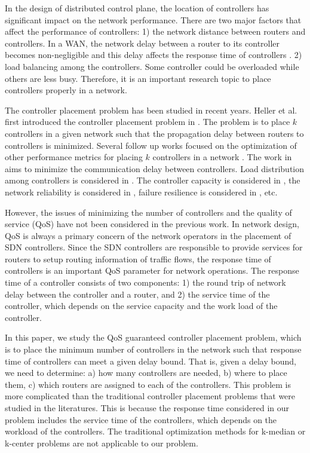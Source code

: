 \documentclass[conference]{IEEEtran}
\begin{document}
In the design of distributed control plane, the location of controllers has significant impact on the network performance. There are two major factors that affect the performance of controllers: 1) the network distance between routers and controllers. In a WAN, the network delay between a router to its controller becomes non-negligible and this delay affects the response time of controllers \cite{jain2013b4}. 2) load balancing among the controllers. Some controller could be overloaded while others are less busy. Therefore, it is an important research topic to place controllers properly in a network.       

The controller placement problem has been studied in recent years. Heller et al. first introduced the controller placement problem in \cite{heller2012controller}. The problem is to place $k$ controllers in a given network such that the propagation delay between routers to controllers is minimized. Several follow up works focused on the optimization of other performance metrics for placing $k$ controllers in a network \cite{schmid2013exploiting,jimenez2014controller,yao2014capacitated,ros2014five,hock2013pareto}. 
The work in \cite{schmid2013exploiting} aims to minimize the communication delay between controllers. Load distribution among controllers is considered in \cite{jimenez2014controller}. The controller capacity is considered in \cite{yao2014capacitated}, the network reliability is considered in \cite{ros2014five}, failure resilience is considered in \cite{hock2013pareto}, etc. 

However, the issues of minimizing the number of controllers and the quality of service (QoS) have not been considered in the previous work. In network design, QoS is always a primary concern of the network operators in the placement of SDN controllers. Since the SDN controllers are responsible to provide services for routers to setup routing information of traffic flows, the response time of controllers is an important QoS parameter for network operations. The response time of a controller consists of two components: 1) the round trip of network delay between the controller and a router, and 2) the service time of the controller, which depends on the service capacity and the work load of the controller. 

In this paper, we study the QoS guaranteed controller placement problem, which is to place the minimum number of controllers in the network such that response time of controllers can meet a given delay bound. That is, given a delay bound, we need to determine: a) how many controllers are needed, b) where to place them, c) which routers are assigned to each of the controllers. This problem is more complicated than the traditional controller placement problems that were studied in the literatures. This is because the response time considered in our problem includes the service time of the controllers, which depends on the workload of the controllers. The traditional optimization methods for k-median or k-center problems are not applicable to our problem.
\end{document}
